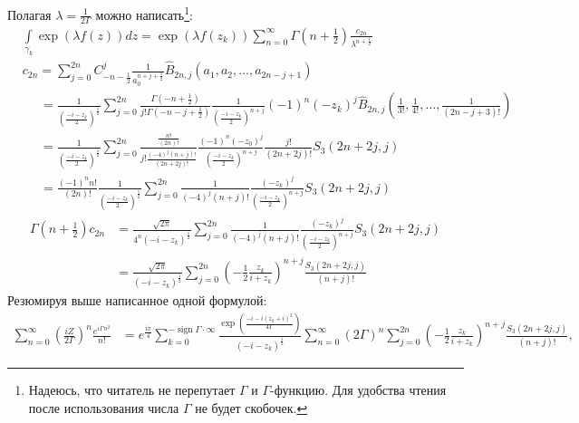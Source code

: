 \documentclass[a4paper, 12pt]{article}
\DeclareMathOperator*{\sign}{sign}
\begin{document}
Полагая $\lambda = \frac{1}{2\Gamma}$ можно написать\footnote{Надеюсь, что читатель не перепутает $\Gamma$ и $\Gamma$-функцию. Для удобства чтения после использования числа $\Gamma$ не будет скобочек.}:
\begin{equation}
\begin{aligned}
    &\int\limits_{\gamma_k} \exp\left(\lambda f(z)\right) dz 
    = \exp\left(\lambda f(z_k)\right)\sum\limits_{n=0}^{\infty} \Gamma\left(n+\frac{1}{2}\right)\frac{c_{2n}}{\lambda^{n+\frac{1}{2}}}\\
    &c_{2n} =
    \sum\limits_{j=0}^{2n} C_{-n-\frac{1}{2}}^j\frac{1}{a_0^{n+j+\frac{1}{2}}}\hat{B}_{2n, j}\left(a_1, a_2, \dots, a_{2n-j+1}\right) \\
    &\;\;\;\;\; = \frac{1}{\left(\frac{-i-z_k}{2}\right)^{\frac{1}{2}}}
    \sum\limits_{j=0}^{2n} \frac{\Gamma\left(-n+\frac{1}{2}\right)}{j!\Gamma\left(-n-j+\frac{1}{2}\right)}
    \frac{1}{\left(\frac{-i-z_k}{2}\right)^{n+j}}
    (-1)^n (-z_k)^j\hat B_{2n, j}\left(\frac{1}{3!}, \frac{1}{4!}, \dots, \frac{1}{(2n-j+3)!}\right)\\
    &\;\;\;\;\; = \frac{1}{\left(\frac{-i-z_k}{2}\right)^{\frac{1}{2}}}
    \sum\limits_{j=0}^{2n} \frac{\frac{n!}{(2n)!}}{j!\frac{(-4)^j(n+j)!}{(2n+2j)!}}
    \frac{(-1)^n (-z_0)^j}{\left(\frac{-i-z_k}{2}\right)^{n+j}} \frac{j!}{(2n+2j)!}S_3(2n+2j, j)\\
    &\;\;\;\;\; = \frac{(-1)^n n!}{(2n)!}\frac{1}{\left(\frac{-i-z_k}{2}\right)^{\frac{1}{2}}}
    \sum\limits_{j=0}^{2n} \frac{1}{(-4)^j(n+j)!}
    \frac{ (-z_k)^j}{\left(\frac{-i-z_k}{2}\right)^{n+j}} S_3(2n+2j, j)
\end{aligned}
\end{equation}
\begin{equation}
\begin{aligned}
    \Gamma\left(n+\frac{1}{2}\right)c_{2n} &= \frac{\sqrt{2\pi}}{4^n \left(-i-z_k\right)^{\frac{1}{2}}}
    \sum\limits_{j=0}^{2n} \frac{1}{(-4)^j(n+j)!}
    \frac{ (-z_k)^j}{\left(\frac{-i-z_k}{2}\right)^{n+j}} S_3(2n+2j, j) \\
    &=\frac{\sqrt{2\pi}}{\left(-i-z_k\right)^{\frac{1}{2}}}
    \sum\limits_{j=0}^{2n}\left(-\frac{1}{2}\frac{z_k}{i+z_k}\right)^{n+j}\frac{S_3(2n+2j, j)}{(n+j)!}
\end{aligned}
\end{equation}
Резюмируя выше написанное одной формулой:
\begin{equation}
\begin{aligned}
    \sum\limits_{n=0}^{\infty}\left(\frac{iZ}{2\Gamma}\right)^n  \frac{e^{i\Gamma n^2}}{n!} &= e^{\frac{i\pi}{4}}
    \sum\limits_{k=0}^{-\sign\Gamma\cdot\infty} \frac{\exp\left(\frac{-i-i(z_k+i)^2}{4\Gamma}\right)}{(-i-z_k)^{\frac{1}{2}}}
    \sum\limits_{n=0}^{\infty}\left(2\Gamma\right)^n
    \sum\limits_{j=0}^{2n}\left(-\frac{1}{2}\frac{z_k}{i+z_k}\right)^{n+j}\frac{S_3(2n+2j, j)}{(n+j)!},
\end{aligned}
\end{equation}
\end{document}
